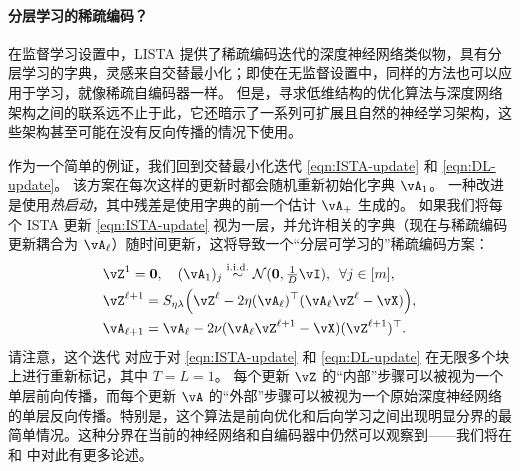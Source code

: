 \documentclass[../../book-main.tex]{subfiles}
\begin{document}
\paragraph{分层学习的稀疏编码？}



在监督学习设置中，LISTA 提供了稀疏编码迭代的深度神经网络类似物，具有分层学习的字典，灵感来自交替最小化；即使在无监督设置中，同样的方法也可以应用于学习，就像稀疏自编码器一样。
但是，寻求低维结构的优化算法与深度网络架构之间的联系远不止于此，它还暗示了一系列可扩展且自然的神经学习架构，这些架构甚至可能在没有反向传播的情况下使用。

作为一个简单的例证，我们回到交替最小化迭代 \eqref{eqn:ISTA-update} 和 \eqref{eqn:DL-update}。
该方案在每次这样的更新时都会随机重新初始化字典 $\vA_1$。
一种改进是使用\textit{热启动}，其中残差是使用字典的前一个估计 $\vA_+$ 生成的。
如果我们将每个 ISTA 更新 \eqref{eqn:ISTA-update} 视为一层，并允许相关的字典（现在与稀疏编码更新耦合为 $\vA_\ell$）随时间更新，这将导致一个“分层可学习的”稀疏编码方案：
\begin{align}
    & \vZ^{1}
     = \Zero, \quad (\vA_{1})_j
     \simiid \dNorm(\vzero, \tfrac{1}{D}\vI), \enspace \forall j \in [m], \\ 
    & \vZ^{\ell + 1} = S_{\eta\lambda}\rp{\vZ^{\ell}
    - 2\eta(\vA_{\ell})^\top(\vA_{\ell}\vZ^{\ell}
    - \vX)},\label{eq:ISTA-update-layerwise}\\ 
    & \vA_{\ell + 1} = \vA_{\ell}- 2\nu (\vA_{\ell}\vZ^{\ell + 1}
    - \vX)(\vZ^{\ell + 1})^\top.
\end{align}
请注意，这个迭代 %
对应于对 \eqref{eqn:ISTA-update} 和 \eqref{eqn:DL-update} 在无限多个块上进行重新标记，其中 $T = L = 1$。
每个更新 $\vZ$ 的“内部”步骤可以被视为一个单层前向传播，而每个更新 $\vA$ 的“外部”步骤可以被视为一个原始深度神经网络的单层反向传播。特别是，这个算法是前向优化和后向学习之间出现明显分界的最简单情况。这种分界在当前的神经网络和自编码器中仍然可以观察到——我们将在  和  中对此有更多论述。
\end{document}

